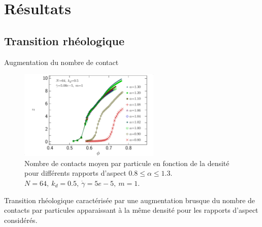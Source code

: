 \documentclass{beamer}
\begin{document}
\section{Résultats}

\subsection{Transition rhéologique}

\begin{frame}{Augmentation du nombre de contact}
\vspace{-10pt}

\begin{figure}[h!]
\centering
\includegraphics[width=0.6\textwidth]{figures/figs/z_phi_0064_KDk500_Ml100_GDg500}
\caption{Nombre de contacts moyen par particule en fonction de la densité pour différents rapports d'aspect $0.8\le\alpha\le1.3$. $N=64,~ k_d=0.5,~ \dot{\gamma}=5e-5,~ m=1$.}
\end{figure}

\vspace{-10pt}
Transition rhéologique caractérisée par une augmentation brusque du nombre de contacts par particules apparaissant à la même densité pour les rapports d'aspect considérés.

\end{frame}
\end{document}
